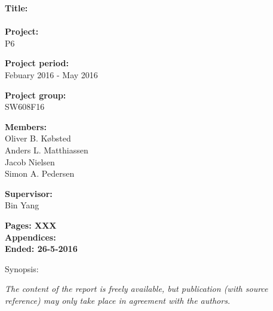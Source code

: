 \begin{minipage}[t]{0.48\textwidth}
\textbf{Title:} \\[5pt]\bigskip\hspace{2ex}    
\name\\
\textbf{Project:} \\[5pt]\bigskip\hspace{2ex}
P6

\textbf{Project period:} \\[5pt]\bigskip\hspace{2ex}
Febuary 2016 - May 2016

\textbf{Project group:} \\[5pt]\bigskip\hspace{2ex}
SW608F16

\textbf{Members:} \\[5pt]\hspace*{2ex}
Oliver B. Købsted \\\hspace*{2ex}
Anders L. Matthiassen \\\hspace*{2ex}
Jacob Nielsen \\\hspace*{2ex}
Simon A. Pedersen \\\hspace*{2ex}


\textbf{Supervisor:} \\[5pt]\hspace*{2ex}
Bin Yang


\vspace*{1cm}

\textbf{Pages: XXX} \\
\textbf{Appendices: } \\
\textbf{Ended: 26-5-2016}

\end{minipage}
\hfill
\begin{minipage}[t]{0.483\textwidth}
Synopsis: \\[5pt]
\fbox{\parbox{7cm}{\bigskip\bigskip}}
\end{minipage}

\vfill

{\footnotesize\itshape The content of the report is freely available, but publication (with source reference) may only take place in agreement with the authors.}

